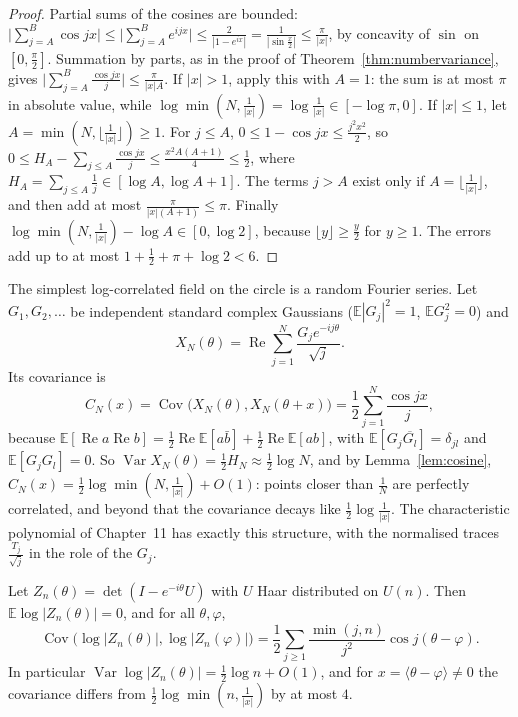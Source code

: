 \begin{proof}
Partial sums of the cosines are bounded: $\bigl|\sum_{j=A}^B\cos jx\bigr|\le\bigl|\sum_{j=A}^Be^{ijx}\bigr|\le\frac2{|1-e^{ix}|}=\frac1{|\sin\frac x2|}\le\frac\pi{|x|}$, by concavity of $\sin$ on $[0,\frac\pi2]$. Summation by parts, as in the proof of
Theorem~\ref{thm:numbervariance}, gives $\bigl|\sum_{j=A}^B\frac{\cos jx}j\bigr|\le\frac\pi{|x|A}$. If $|x|>1$, apply this with $A=1$: the sum is at most $\pi$ in absolute value, while $\log\min(N,\frac1{|x|})=\log\frac1{|x|}\in[-\log\pi,0]$. If $|x|\le1$, let
$A=\min(N,\lfloor\frac1{|x|}\rfloor)\ge1$. For $j\le A$, $0\le1-\cos jx\le\frac{j^2x^2}2$, so $0\le H_A-\sum_{j\le A}\frac{\cos jx}j\le\frac{x^2A(A+1)}4\le\frac12$, where $H_A=\sum_{j\le A}\frac1j\in[\log A,\log A+1]$. The terms $j>A$ exist only if
$A=\lfloor\frac1{|x|}\rfloor$, and then add at most $\frac\pi{|x|(A+1)}\le\pi$. Finally $\log\min(N,\frac1{|x|})-\log A\in[0,\log2]$, because $\lfloor y\rfloor\ge\frac y2$ for $y\ge1$. The errors add up to at most $1+\frac12+\pi+\log2<6$.
\end{proof}

The simplest log-correlated field on the circle is a random Fourier series. Let $G_1,G_2,\dots$ be independent standard complex Gaussians ($\mathbb E|G_j|^2=1$, $\mathbb EG_j^2=0$) and
\begin{equation}\label{eq:fourierfield}
X_N(\theta)=\operatorname{Re}\sum_{j=1}^N\frac{G_je^{-ij\theta}}{\sqrt j}.
\end{equation}
Its covariance is
\[
C_N(x)=\operatorname{Cov}\bigl(X_N(\theta),X_N(\theta+x)\bigr)=\frac12\sum_{j=1}^N\frac{\cos jx}j,
\]
because $\mathbb E[\operatorname{Re}a\operatorname{Re}b]=\frac12\operatorname{Re}\mathbb E[a\bar b]+\frac12\operatorname{Re}\mathbb E[ab]$, with $\mathbb E[G_j\overline{G_l}]=\delta_{jl}$ and $\mathbb E[G_jG_l]=0$. So $\operatorname{Var}X_N(\theta)=\frac12H_N\approx\frac12\log N$, and by Lemma~\ref{lem:cosine},
$C_N(x)=\frac12\log\min(N,\frac1{|x|})+O(1)$: points closer than $\frac1N$ are perfectly correlated, and beyond that the covariance decays like $\frac12\log\frac1{|x|}$. The characteristic polynomial of Chapter~11 has exactly this structure,
with the normalised traces $\frac{T_j}{\sqrt j}$ in the role of the $G_j$.

\begin{proposition}\label{prop:cuelogcorr}
Let $Z_n(\theta)=\det(I-e^{-i\theta}U)$ with $U$ Haar distributed on $U(n)$. Then $\mathbb E\log|Z_n(\theta)|=0$, and for all $\theta,\varphi$,
\[
\operatorname{Cov}\bigl(\log|Z_n(\theta)|,\log|Z_n(\varphi)|\bigr)=\frac12\sum_{j\ge1}\frac{\min(j,n)}{j^2}\cos j(\theta-\varphi).
\]
In particular $\operatorname{Var}\log|Z_n(\theta)|=\frac12\log n+O(1)$, and for $x=\langle\theta-\varphi\rangle\ne0$ the covariance differs from $\frac12\log\min(n,\frac1{|x|})$ by at most $4$.
\end{proposition}

